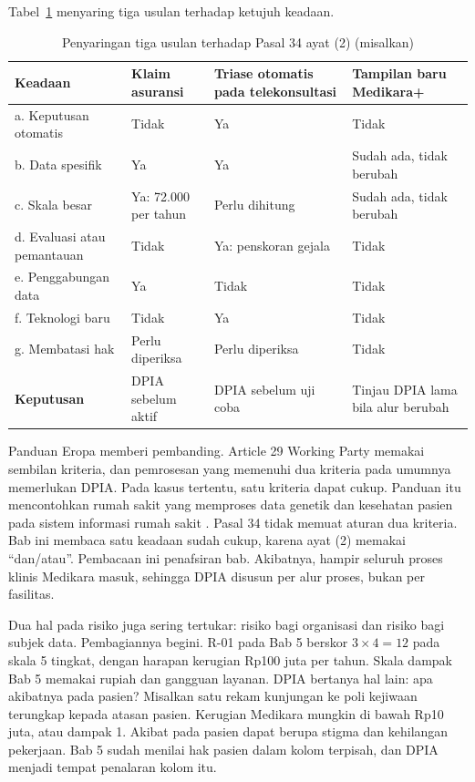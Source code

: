 Tabel~\ref{tab:ch07-dpia} menyaring tiga usulan terhadap ketujuh keadaan.

\begin{table}[!htb]
  \centering\small
  \caption{Penyaringan tiga usulan terhadap Pasal 34 ayat (2) (misalkan)}\label{tab:ch07-dpia}
  \begin{tabularx}{\textwidth}{|>{\raggedright\arraybackslash}p{}|>{\raggedright\arraybackslash}X|>{\raggedright\arraybackslash}X|>{\raggedright\arraybackslash}X|}
    \hline
    \textbf{Keadaan} & \textbf{Klaim asuransi} & \textbf{Triase otomatis pada telekonsultasi} &
    \textbf{Tampilan baru Medikara+} \\ \hline
    a. Keputusan otomatis & Tidak & Ya & Tidak \\ \hline
    b. Data spesifik & Ya & Ya & Sudah ada, tidak berubah \\ \hline
    c. Skala besar & Ya: 72.000 per tahun & Perlu dihitung & Sudah ada, tidak berubah \\ \hline
    d. Evaluasi atau pemantauan & Tidak & Ya: penskoran gejala & Tidak \\ \hline
    e. Penggabungan data & Ya & Tidak & Tidak \\ \hline
    f. Teknologi baru & Tidak & Ya & Tidak \\ \hline
    g. Membatasi hak & Perlu diperiksa & Perlu diperiksa & Tidak \\ \hline
    \textbf{Keputusan} & DPIA sebelum aktif & DPIA sebelum uji coba & Tinjau DPIA lama bila alur
    berubah \\ \hline
  \end{tabularx}
\end{table}

Panduan Eropa memberi pembanding. Article 29 Working Party memakai sembilan kriteria, dan pemrosesan
yang memenuhi dua kriteria pada umumnya memerlukan DPIA. Pada kasus tertentu, satu kriteria dapat
cukup. Panduan itu mencontohkan rumah sakit yang memproses data genetik dan kesehatan pasien pada
sistem informasi rumah sakit \cite{c07-wp248}. Pasal 34 tidak memuat aturan dua kriteria. Bab ini
membaca satu keadaan sudah cukup, karena ayat (2) memakai ``dan/atau''. Pembacaan ini penafsiran
bab. Akibatnya, hampir seluruh proses klinis Medikara masuk, sehingga DPIA disusun per alur proses,
bukan per fasilitas.

Dua hal pada risiko juga sering tertukar: risiko bagi organisasi dan risiko bagi subjek data.
Pembagiannya begini. R-01 pada Bab 5 berskor $3 \times 4 = 12$ pada skala 5 tingkat, dengan harapan
kerugian Rp100 juta per tahun. Skala dampak Bab 5 memakai rupiah dan gangguan layanan. DPIA bertanya
hal lain: apa akibatnya pada pasien? Misalkan satu rekam kunjungan ke poli kejiwaan terungkap kepada
atasan pasien. Kerugian Medikara mungkin di bawah Rp10 juta, atau dampak 1. Akibat pada pasien dapat
berupa stigma dan kehilangan pekerjaan. Bab 5 sudah menilai hak pasien dalam kolom terpisah, dan
DPIA menjadi tempat penalaran kolom itu.


